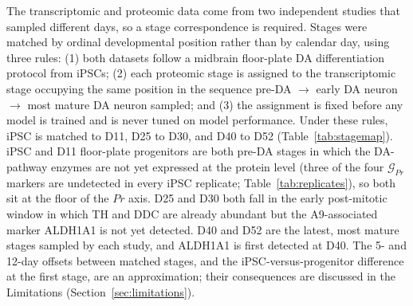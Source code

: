 \documentclass[5p,times,twocolumn]{elsarticle}
\newcommand{\rtag}[1]{}
\newenvironment{revblock}[1]{\par\rtag{#1}\ignorespaces}{\par}
\begin{document}
\begin{revblock}{R2.3,R2.22}
  The transcriptomic and proteomic data come from two
  independent studies that sampled different days, so a stage
  correspondence is required.
  Stages were matched by ordinal developmental
    position rather than by calendar day, using three rules:
  (1) both datasets follow a midbrain floor-plate DA
  differentiation protocol from iPSCs;
  (2) each proteomic stage is assigned to the transcriptomic
  stage occupying the same position in the sequence
  pre-DA $\to$ early DA neuron $\to$ most mature DA neuron
  sampled; and
  (3) the assignment is fixed before any model is trained
  and is never tuned on model performance.
  Under these rules, iPSC is matched to D11, D25 to D30, and
  D40 to D52 (Table~\ref{tab:stagemap}).
  iPSC and D11 floor-plate progenitors are both pre-DA stages
  in which the DA-pathway enzymes are not yet expressed at the
  protein level (three of the four $\mathcal{G}_{Pr}$ markers
  are undetected in every iPSC replicate;
  Table~\ref{tab:replicates}), so both sit at the floor of the
  $Pr$ axis. D25 and D30 both fall in the early post-mitotic
  window in which TH and DDC are already abundant but the
  A9-associated marker ALDH1A1 is not yet detected. D40 and D52
  are the latest, most mature stages sampled by each study, and
  ALDH1A1 is first detected at D40.
  The 5- and 12-day offsets between matched stages, and the
  iPSC-versus-progenitor difference at the first stage, are an
  approximation; their consequences are discussed in the
  Limitations (Section~\ref{sec:limitations}).
\end{revblock}

\begin{table}[!htbp]
  \color{black}
  \caption{\rtag{R2.10}Correspondence between transcriptomic and
    proteomic stages. $n$ is the number of cells (scRNA-seq) or of
    CTRL biological replicates (proteomics) at each stage.}
  \label{tab:stagemap}
  \centering
\end{table}
\end{document}
